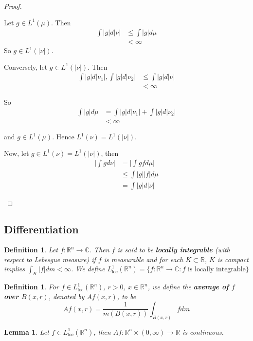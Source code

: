 \documentclass[12pt]{amsart}
\newtheorem{lem}[thm]{Lemma}
\newtheorem{defn}[thm]{Definition}
\newcommand{\C}{\mathbb{C}}
\newcommand{\R}{\mathbb{R}}
\newcommand{\Ll}{L^1_{\text{loc}}(\R^n)}
\begin{document}
\begin{proof}
\begin{enumerate}
Let $g \in L^1(\mu)$. Then 
\begin{align*}
\int |g| d |\nu| 
&\leq \int |g| d \mu \\
&< \infty
\end{align*}
So $g \in L^1(|\nu|)$.

Conversely, let $g \in L^1(|\nu|)$. Then 
\begin{align*}
\int |g| d|\nu_1|, \int |g| d |\nu_2| 
& \leq \int |g|d |\nu|\\
& < \infty
\end{align*}

So 
\begin{align*}
\int |g| d\mu
& =\int |g| d|\nu_1| + \int |g| d |\nu_2| \\
& < \infty
\end{align*}

and $g \in L^1(\mu)$. Hence $L^1(\nu) = L^1(|\nu|)$. 

Now, let $g \in L^1(\nu) = L^1(|\nu|)$, then 
\begin{align*}
\bigg| \int g d\nu \bigg| 
&= \bigg| \int g f d\mu \bigg| \\
& \leq \int |g||f|d\mu\\
& = \int |g| d |\nu|
\end{align*}

\end{enumerate}
\end{proof}

\subsection{Differentiation}

\begin{defn}
Let $f: \R^n \rightarrow \C$. Then $f$ is said to be \textbf{locally integrable} (with respect to Lebesgue measure) if $f$ is measurable and for each $K \subset \R$, $K$ is compact implies $\int_K |f| dm < \infty$. We define $L^1_{\text{loc}}(\R^n) = \{f:\R^n \rightarrow \C: f \text{ is locally integrable}\}$
\end{defn}

\begin{defn}
For $f \in \Ll$, $r>0$, $x \in \R^n$, we define the \textbf{average of $f$ over $B(x,r)$}, denoted by $Af(x,r)$, to be $$Af(x,r) = \frac{1}{m(B(x,r))}\int_{B(x,r)}fdm$$
\end{defn}

\begin{lem}
Let $f \in \Ll$, then $Af:\R^n \times (0, \infty)\rightarrow \R$ is continuous.
\end{lem}
\end{document}
